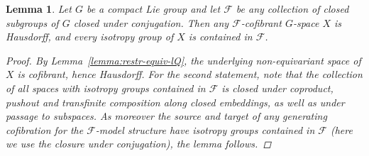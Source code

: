 \documentclass[reqno]{memo-l}
\theoremstyle{mythm}
\newtheorem{lemma}[thm]{Lemma}
\theoremstyle{definition}
\numberwithin{equation}{section}
\newcommand{\Ff}{{\mathcal{F}}}
\begin{document}
\begin{lemma}\label{lemma:G-CW-Hausdorff}
    Let $G$ be a compact Lie group and let $\Ff$ be any collection of closed subgroups of $G$ closed under conjugation. Then any $\Ff$-cofibrant $G$-space $X$ is Hausdorff, and every isotropy group of $X$ is contained in $\Ff$.
    \begin{proof}
        By Lemma~\ref{lemma:restr-equiv-lQ}, the underlying non-equivariant space of $X$ is cofibrant, hence Hausdorff. For the second statement, note that the collection of all spaces with isotropy groups contained in $\Ff$ is closed under coproduct, pushout and transfinite composition along closed embeddings, as well as under passage to subspaces. As moreover the source and target of any generating cofibration for the $\Ff$-model structure have isotropy groups contained in $\Ff$ (here we use the closure under conjugation), the lemma follows.
    \end{proof}
\end{lemma}
\end{document}
